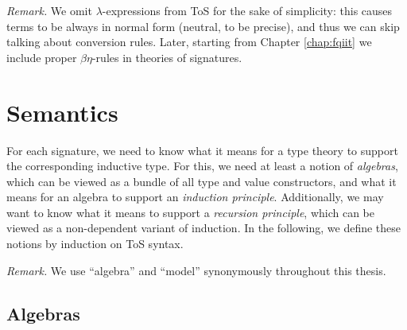 \documentclass[12pt,a4paper,twoside,openany]{book}
\theoremstyle{remark}
\theoremstyle{definition}
\theoremstyle{theorem}
\begin{document}
\emph{Remark.} We omit $\lambda$-expressions from ToS for the sake of
simplicity: this causes terms to be always in normal form (neutral, to be
precise), and thus we can skip talking about conversion rules. Later, starting
from Chapter \ref{chap:fqiit} we include proper $\beta\eta$-rules in theories of
signatures.

\section{Semantics}
\label{sec:simple-semantics}

For each signature, we need to know what it means for a type theory to support
the corresponding inductive type. For this, we need at least a notion of
\emph{algebras}, which can be viewed as a bundle of all type and
value constructors, and what it means for an algebra to support an
\emph{induction principle}.  Additionally, we may want to know what it means to
support a \emph{recursion principle}, which can be viewed as a non-dependent
variant of induction. In the following, we define these notions by induction on
ToS syntax.

\emph{Remark.} We use ``algebra'' and ``model'' synonymously throughout
this thesis.

\subsection{Algebras}
\end{document}
